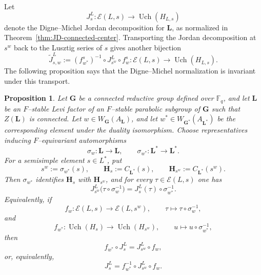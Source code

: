 \documentclass{amsart}
\theoremstyle{plain}
\numberwithin{equation}{section}
\newtheorem{proposition}[theorem]{Proposition}
\theoremstyle{definition}
\newcommand{\fq}{\mathbb{F}_{q}}
\newcommand{\Uch}{\operatorname{Uch}}
\newcommand{\bG}{\mathbf{G}}
\newcommand{\bL}{\mathbf{L}}
\newcommand{\bH}{\mathbf{H}}
\begin{document}
Let
\[
J_s^L:\mathcal E(L,s)\longrightarrow \Uch(H_{L,s})
\]
denote the Digne--Michel Jordan decomposition for $\bL$, as normalized in
Theorem~\ref{thm:JD-connected-center}.  Transporting the Jordan
decomposition at $s^w$ back to the Lusztig series of $s$ gives another
bijection
\[
\widetilde J_{s,w}^L
:=
(f_{w^*}^s)^{-1}\circ J_{s^w}^L\circ f_w^s
:
\mathcal E(L,s)\longrightarrow \Uch(H_{L,s}).
\]
The following proposition says that the Digne--Michel normalization is
invariant under this transport.
\begin{proposition}
\label{prop:compatibility-JDs-for-Levi-with-connected-center}
Let $\bG$ be a connected reductive group defined over $\fq$, and let
$\bL$ be an $F$--stable Levi factor of an $F$--stable parabolic subgroup of
$\bG$ such that $Z(\bL)$ is connected.  Let
$w\in W_{\bG}(A_{\bL})$, and let
$w^*\in W_{\bG^*}(A_{\bL^*})$ be the corresponding element under the duality
isomorphism.  Choose representatives inducing $F$--equivariant automorphisms
\[
\sigma_w:\bL\longrightarrow \bL,\qquad
\sigma_{w^*}:\bL^*\longrightarrow \bL^* .
\]
For a semisimple element $s\in L^*$, put
\[
s^w:=\sigma_{w^*}(s),\qquad
\bH_s:=C_{\bL^*}(s),\qquad
\bH_{s^w}:=C_{\bL^*}(s^w).
\]
Then $\sigma_{w^*}$ identifies $\bH_s$ with $\bH_{s^w}$, and for every
$\tau\in \mathcal{E}(L,s)$ one has
\[
J_{s^w}^{L}\bigl(\tau\circ\sigma_w^{-1}\bigr)
=
J_s^L(\tau)\circ\sigma_{w^*}^{-1}.
\]
Equivalently, if
\[
f_w:\mathcal{E}(L,s)\longrightarrow \mathcal{E}(L,s^w),
\qquad
\tau\longmapsto \tau\circ\sigma_w^{-1},
\]
and
\[
f_{w^*}:\Uch(H_s)\longrightarrow \Uch(H_{s^w}),
\qquad
u\longmapsto u\circ\sigma_{w^*}^{-1},
\]
then
\[
f_{w^*}\circ J_s^L
=
J_{s^w}^L\circ f_w,
\]
or, equivalently,
\[
J_s^L
=
f_{w^*}^{-1}\circ J_{s^w}^{L}\circ f_w .
\]
\end{proposition}
\end{document}
